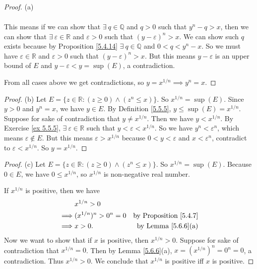\begin{proof}{(a)}
\begin{enumerate}[label=(\Roman*)]
\begin{align*}
    \end{align*}
    This means if we can show that \(\exists\ q \in \mathds{Q}\) and \(q > 0\) such that \(y^n - q > x\), then we can show that \(\exists\ \varepsilon \in \mathds{R}\) and \(\varepsilon > 0\) such that \((y - \varepsilon)^n > x\).
    We can show such \(q\) exists because by Proposition \ref{5.4.14} \(\exists\ q \in \mathds{Q}\) and \(0 < q < y^n - x\).
    So we must have \(\varepsilon \in \mathds{R}\) and \(\varepsilon > 0\) such that \((y - \varepsilon)^n > x\).
    But this means \(y - \varepsilon\) is an upper bound of \(E\) and \(y - \varepsilon < y = \sup(E)\), a contradiction.
\end{enumerate}
From all cases above we get contradictions, so \(y = x^{1 / n} \implies y^n = x\).
\end{proof}

\begin{proof}{(b)}
Let \(E = \{z \in \mathds{R} : (z \geq 0) \land (z^n \leq x)\}\).
So \(x^{1 / n} = \sup(E)\).
Since \(y > 0\) and \(y^n = x\), we have \(y \in E\).
By Definition \ref{5.5.5}, \(y \leq \sup(E) = x^{1 / n}\).
Suppose for sake of contradiction that \(y \neq x^{1 / n}\).
Then we have \(y < x^{1 / n}\).
By Exercise \ref{ex 5.5.5}, \(\exists\ \varepsilon \in \mathds{R}\) such that \(y < \varepsilon < x^{1 / n}\).
So we have \(y^n < \varepsilon^n\), which means \(\varepsilon \notin E\).
But this means \(\varepsilon > x^{1 / n}\) because \(0 < y < \varepsilon\) and \(x < \varepsilon^n\), contradict to \(\varepsilon < x^{1 / n}\).
So \(y = x^{1 / n}\).
\end{proof}

\begin{proof}{(c)}
Let \(E = \{z \in \mathds{R} : (z \geq 0) \land (z^n \leq x)\}\).
So \(x^{1 / n} = \sup(E)\).
Because \(0 \in E\), we have \(0 \leq x^{1 / n}\), so \(x^{1 / n}\) is non-negative real number.

If \(x^{1 / n}\) is positive, then we have
\begin{align*}
& x^{1 / n} > 0 \\
\implies & (x^{1 / n})^n > 0^n = 0 & \text{by Proposition \ref{5.4.7}} \\
\implies & x > 0. & \text{by Lemma \ref{5.6.6}(a)} \\
\end{align*}
Now we want to show that if \(x\) is positive, then \(x^{1 / n} > 0\).
Suppose for sake of contradiction that \(x^{1 / n} = 0\).
Then by Lemma \ref{5.6.6}(a), \(x = (x^{1 / n})^n = 0^n = 0\), a contradiction.
Thus \(x^{1 / n} > 0\).
We conclude that \(x^{1 / n}\) is positive iff \(x\) is positive.
\end{proof}

